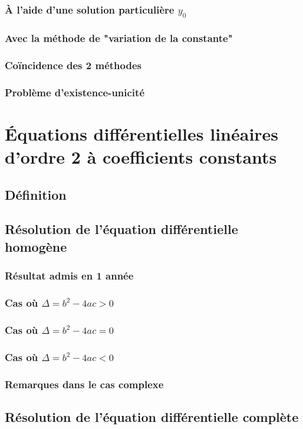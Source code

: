\documentclass[12pt,a4paper,french]{book}
\begin{document}
			\subsubsection{À l'aide d'une solution particulière $y_0$}
			\subsubsection{Avec la méthode de "variation de la constante"}
			\subsubsection{Coïncidence des 2 méthodes}
			\subsubsection{Problème d'existence-unicité}
	\section{Équations différentielles linéaires d'ordre 2 à coefficients constants}
		\subsection{Définition}
		\subsection{Résolution de l'équation différentielle homogène}
			\subsubsection{Résultat admis en 1 année}
			\subsubsection{Cas où $\Delta = b^{2}-4ac > 0$}
			\subsubsection{Cas où $\Delta = b^{2}-4ac = 0$}
			\subsubsection{Cas où $\Delta = b^{2}-4ac < 0$}
			\subsubsection{Remarques dans le cas complexe}
		\subsection{Résolution de l'équation différentielle complète}
\end{document}
